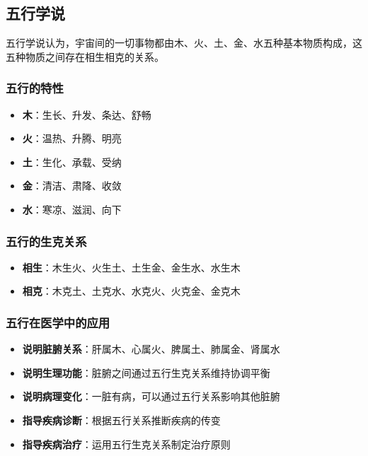 \documentclass[12pt,UTF8]{ctexbook}
\begin{document}
\subsection{五行学说}

五行学说认为，宇宙间的一切事物都由木、火、土、金、水五种基本物质构成，这五种物质之间存在相生相克的关系。

\subsubsection{五行的特性}

\begin{itemize}
\item \textbf{木}：生长、升发、条达、舒畅
\item \textbf{火}：温热、升腾、明亮
\item \textbf{土}：生化、承载、受纳
\item \textbf{金}：清洁、肃降、收敛
\item \textbf{水}：寒凉、滋润、向下
\end{itemize}

\subsubsection{五行的生克关系}

\begin{itemize}
\item \textbf{相生}：木生火、火生土、土生金、金生水、水生木
\item \textbf{相克}：木克土、土克水、水克火、火克金、金克木
\end{itemize}

\subsubsection{五行在医学中的应用}

\begin{itemize}
\item \textbf{说明脏腑关系}：肝属木、心属火、脾属土、肺属金、肾属水
\item \textbf{说明生理功能}：脏腑之间通过五行生克关系维持协调平衡
\item \textbf{说明病理变化}：一脏有病，可以通过五行关系影响其他脏腑
\item \textbf{指导疾病诊断}：根据五行关系推断疾病的传变
\item \textbf{指导疾病治疗}：运用五行生克关系制定治疗原则
\end{itemize}
\end{document}
